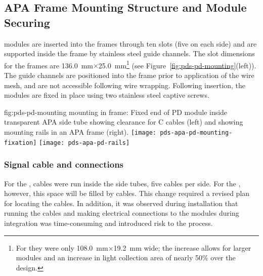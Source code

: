\subsection{APA Frame Mounting Structure and Module Securing}	
\label{sec:fdsp-pd-assy-frames}

 modules are inserted into the  frames through ten slots (five on each side) and are supported inside the frame by stainless steel guide channels.  The slot dimensions for the   frames 
are \SI{136.0}{mm}$\times$\SI{25.0}{mm}\footnote{For  they were only \SI{108.0}{mm}$\times$\SI{19.2}{mm} wide; the increase allows for larger  modules and an increase in light collection area of nearly 50\% over the  design.}   
(see Figure~\ref{fig:pds-pd-mounting}(left)).
The guide channels are positioned into the  frame prior to application of the wire %
mesh, %
and are not accessible following wire wrapping. Following insertion, the  modules are fixed in place using two stainless steel captive screws.

 

\begin{dunefigure}{fig:pds-pd-mounting}
{ mounting in  frame: Fixed end of PD module inside transparent APA side tube showing clearance for C cables (left) and showing  mounting rails in an APA frame  (right).}
	\texttt{[image: pds-apa-pd-mounting-fixation]}
	\texttt{[image: pds-apa-pd-rails]}
\end{dunefigure}

\subsubsection{Signal cable and connections}

For the  , cables were run inside the  side tubes, five cables per side.  For the , however, this space will be filled by  cables.  This change required a revised plan for locating the  cables.  In addition, it was observed during   installation that running the  cables and making electrical connections to the modules during  integration was time-consuming and introduced risk to the process.

